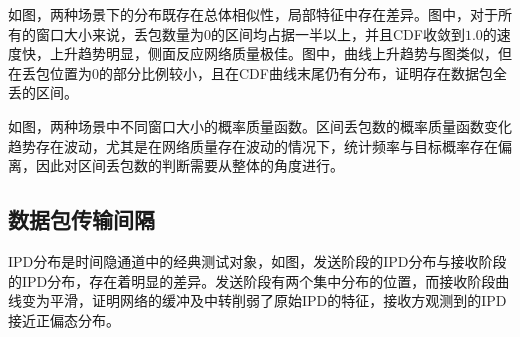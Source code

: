 如图，两种场景下的分布既存在总体相似性，局部特征中存在差异。图中，对于所有的窗口大小来说，丢包数量为0的区间均占据一半以上，并且CDF收敛到$1.0$的速度快，上升趋势明显，侧面反应网络质量极佳。图中，曲线上升趋势与图类似，但在丢包位置为0的部分比例较小，且在CDF曲线末尾仍有分布，证明存在数据包全丢的区间。

如图，两种场景中不同窗口大小的概率质量函数。区间丢包数的概率质量函数变化趋势存在波动，尤其是在网络质量存在波动的情况下，统计频率与目标概率存在偏离，因此对区间丢包数的判断需要从整体的角度进行。

\subsection{数据包传输间隔}
\label{chap:analyze:results:ipd}

IPD分布是时间隐通道中的经典测试对象，如图，发送阶段的IPD分布与接收阶段的IPD分布，存在着明显的差异。发送阶段有两个集中分布的位置，而接收阶段曲线变为平滑，证明网络的缓冲及中转削弱了原始IPD的特征，接收方观测到的IPD接近正偏态分布。


